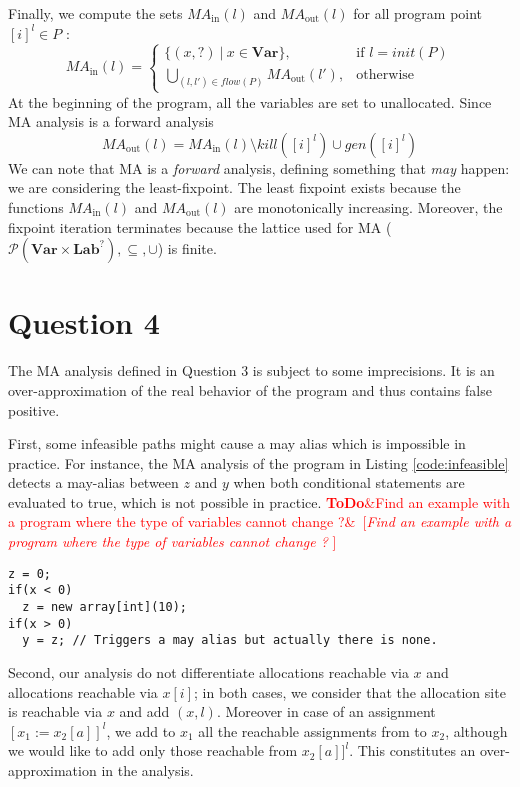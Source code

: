 \documentclass{article}
\newcommand{\todo}[1]{\textcolor{red}{\textbf{ToDo}\ifx&#1&\else ~[\emph{#1} ]~\fi}}
\begin{document}
Finally, we compute the sets \(M\!A_\text{in}(l)\) and \(M\!A_\text{out}(l)\) for all program point \([i]^l \in P\) :
 \[
    M\!A_\text{in}(l) =
    \begin{cases}
      \{(x,?)\ |\ x \in \textbf{Var}\},                        & \text{if } l=init(P)\\
      \bigcup\limits_{(l,l') \in flow(P)} M\!A_\text{out}(l'), & \text{otherwise}
    \end{cases}
\]
At the beginning of the program, all the variables are set to unallocated. Since MA analysis is a forward analysis
\[
    M\!A_\text{out}(l) = M\!A_\text{in}(l) \setminus kill([i]^l) \cup gen([i]^l)
\]
We can note that MA is a {\em forward} analysis, defining something that {\em may} happen: we are considering the least-fixpoint.
The least fixpoint exists because the functions \(M\!A_\text{in}(l)\) and \(M\!A_\text{out}(l)\) are monotonically increasing.
Moreover, the fixpoint iteration terminates because the lattice used for MA (\(\mathcal{P}(\textbf{Var} \times \textbf{Lab}^?), \subseteq, \cup\)) is finite.

\section*{Question 4}
The MA analysis defined in Question 3 is subject to some imprecisions. It is an over-approximation of the real behavior of the program and thus contains false positive.

First, some infeasible paths might cause a may alias which is impossible in practice.
For instance, the MA analysis of the program in Listing \ref{code:infeasible} detects a may-alias between \(z\) and \(y\) when both conditional statements are evaluated to true, which is not possible in practice.
\todo{Find an example with a program where the type of variables cannot change ?}
\begin{lstlisting}[caption=Example of infeasible execution path causing a may aliasis., label=code:infeasible]
z = 0;
if(x < 0)
  z = new array[int](10);
if(x > 0)
  y = z; // Triggers a may alias but actually there is none.
\end{lstlisting}

Second, our analysis do not differentiate allocations reachable via \(x\) and allocations reachable via \(x[i]\); in both cases, we consider that the allocation site is reachable via \(x\) and add \((x,l)\).
Moreover in case of an assignment \([x_1 := x_2[a]]^l\), we add to \(x_1\) all the reachable assignments from to \(x_2\), although we would like to add only those reachable from \(x_2[a]]^l\).
This constitutes an over-approximation in the analysis.
\end{document}

